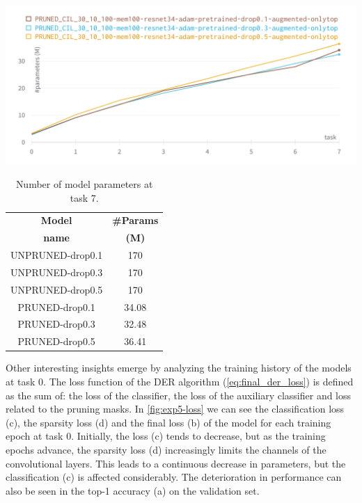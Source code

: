 \begin{table}[ht]
    \begin{minipage}[b]{0.49\linewidth}
        \centering
        \includegraphics[width=1\linewidth]{images/exp/exp5-params.png}
        \label{fig:exp5-params}
    \end{minipage}
    \hfill
    \begin{minipage}[b]{0.49\linewidth}
        \centering
        \begin{tabular}{c|c}
            \hline
            \textbf{Model} &
            \textbf{\#Params} \\
            \textbf{name} &
            \textbf{(M)} \\
            \hline
            \hline
UNPRUNED-drop0.1&170\\
UNPRUNED-drop0.3&170\\
UNPRUNED-drop0.5&170\\
\hline
PRUNED-drop0.1&34.08\\
PRUNED-drop0.3&32.48\\
PRUNED-drop0.5&36.41\\
            \hline
        \end{tabular}
            \caption{Number of model parameters at task 7.}
            \label{table:exp5-params}
    \end{minipage}
\end{table}

Other interesting insights emerge by analyzing the training history of the models at task 0. The loss function of the DER algorithm (\autoref{eq:final_der_loss}) is defined as the sum of: the loss of the classifier, the loss of the auxiliary classifier and loss related to the pruning masks. In \autoref{fig:exp5-loss} we can see the classification loss (c), the sparsity loss (d) and the final loss (b) of the model for each training epoch at task 0. Initially, the loss (c) tends to decrease, but as the training epochs advance, the sparsity loss (d) increasingly limits the channels of the convolutional layers. This leads to a continuous decrease in parameters, but the classification (c) is affected considerably. The deterioration in performance can also be seen in the top-1 accuracy (a) on the validation set.


